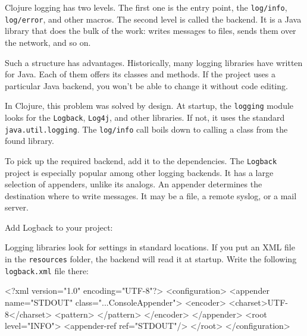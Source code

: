 Clojure logging has two levels. The first one is the entry point, the \verb|log/info|, \verb|log/error|, and other macros. The second level is called the backend. It is a Java library that does the bulk of the work: writes messages to files, sends them over the network, and so on.

Such a structure has advantages. Historically, many logging libraries have written for Java. Each of them offers its classes and methods. If the project uses a particular Java backend, you won't be able to change it without code editing.


In Clojure, this problem was solved by design. At startup, the \verb|logging| module looks for the \verb|Logback|, \verb|Log4j|, and other libraries. If not, it uses the standard \verb|java.util.logging|. The \verb|log/info| call boils down to calling a class from the found library.

To pick up the required backend, add it to the dependencies. The \verb|Logback| project is especially popular among other logging backends. It has a large selection of appenders, unlike its analogs. An appender determines the destination where to write messages. It may be a file, a remote syslog, or a mail server.

Add Logback to your project:

\begin{clojure}
\end{clojure}


Logging libraries look for settings in standard locations. If you put an XML file in the \verb|resources| folder, the backend will read it at startup. Write the following \verb|logback.xml| file there:

\ifnarrow

\begin{english}
  \begin{xml}
<?xml version="1.0" encoding="UTF-8"?>
<configuration>
  <appender name="STDOUT"
    class="...ConsoleAppender">
    <encoder>
      <charset>UTF-8</charset>
      <pattern>
      </pattern>
    </encoder>
  </appender>
  <root level="INFO">
    <appender-ref ref="STDOUT"/>
  </root>
</configuration>
  \end{xml}
\end{english}

